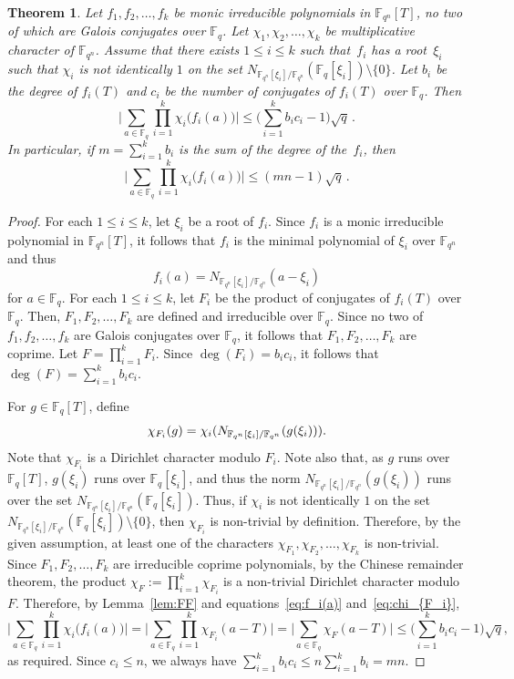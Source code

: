 \documentclass[12pt,reqno]{amsart}
\newtheorem{thm}{Theorem}[section]
\theoremstyle{definition}
\newcommand{\F}{\mathbb{F}}
\begin{document}
\begin{thm}\label{thm:main3}
Let $f_1, f_2,\ldots, f_k$ be monic irreducible polynomials in $\F_{q^n}[T]$, no two of which are Galois conjugates over $\F_q$.  Let $\chi_1,\chi_2,\ldots, \chi_k$ be multiplicative character of $\F_{q^n}$. Assume that there exists $1\leq i \leq k$ such that~$f_i$ has a root~$\xi_i$ such that $\chi_i$ is not identically $1$ on the set $N_{\F_{q^n}[\xi_i]/\F_{q^n}}(\F_q[\xi_i]) \setminus \{0\}$. Let $b_i$ be the degree of $f_i(T)$ and $c_i$ be the number of conjugates of $f_i(T)$ over $\F_q$. Then 
$$\bigg |\sum_{a\in\mathbb{F}_q}\prod_{i=1}^k\chi_i\big(f_i(a)\big) \bigg|\le\bigg(\sum_{i=1}^{k} b_ic_i {}-1\bigg)\sqrt q \,.$$   
In particular, if $m = \sum_{i=1}^{k} b_i$ is the sum of the degree of the~$f_i$, then 
$$\bigg |\sum_{a\in\mathbb{F}_q}\prod_{i=1}^k\chi_i\big(f_i(a)\big) \bigg|\le(mn-1)\sqrt q \,.$$    
\end{thm}
\begin{proof}
For each $1 \leq i \leq k$, let $\xi_i$ be a root of $f_i$. Since $f_i$ is a monic irreducible polynomial in $\F_{q^n}[T]$, it follows that $f_i$ is the minimal polynomial of $\xi_i$ over $\F_{q^n}$ and thus 
\begin{equation}\label{eq:f_i(a)}
f_i(a)=N_{\F_{q^n}[\xi_i]/\F_{q^n}}(a-\xi_i)    
\end{equation}
for $a \in \F_q$. For each $1 \leq i \leq k$, let $F_i$ be the product of conjugates of $f_i(T)$ over $\F_q$. Then, $F_1, F_2, \ldots, F_k$ are defined and irreducible over $\F_q$. Since no two of $f_1, f_2,\ldots, f_k$ are Galois conjugates over $\F_q$, it follows that $F_1, F_2, \ldots, F_k$ are coprime. Let $F=\prod_{i=1}^k F_i$. %
Since $\deg(F_i)=b_ic_i$, it follows that $\deg(F)=\sum_{i=1}^k b_ic_i$.

For $g \in \F_q[T]$, define 
\begin{equation}\label{eq:chi_{F_i}}
\chi_{F_i}(g)=\chi_i(N_{\F_{q^n}[\xi_i]/\F_{q^n}}(g(\xi_i))).
\end{equation}
Note that $\chi_{F_i}$ is a Dirichlet character modulo $F_i$. Note also that, as $g$ runs over $\F_q[T]$, $g(\xi_i)$ runs over $\F_q[\xi_i]$, and thus the norm $N_{\F_{q^n}[\xi_i]/\F_{q^n}}(g(\xi_i))$ runs over the set $N_{\F_{q^n}[\xi_i]/\F_{q^n}}(\F_q[\xi_i])$. Thus, if $\chi_i$ is not identically $1$ on the set $N_{\F_{q^n}[\xi_i]/\F_{q^n}}(\F_q[\xi_i]) \setminus \{0\}$, then $\chi_{F_i}$ is non-trivial by definition. Therefore, by the given assumption, at least one of the characters $\chi_{F_1}, \chi_{F_2}, \ldots, \chi_{F_k}$ is non-trivial. Since $F_1, F_2, \ldots, F_k$ are irreducible coprime polynomials, by the Chinese remainder theorem, the product $\chi_F:=\prod_{i=1}^k \chi_{F_i}$ is a non-trivial Dirichlet character modulo $F$. Therefore, by Lemma~\ref{lem:FF} and equations~\eqref{eq:f_i(a)} and~\eqref{eq:chi_{F_i}},
$$
\bigg |\sum_{a\in\mathbb{F}_q}\prod_{i=1}^k\chi_i\big(f_i(a)\big) \bigg|=\bigg |\sum_{a\in\mathbb{F}_q}\prod_{i=1}^k\chi_{F_i}(a-T) \bigg|=\bigg |\sum_{a\in\mathbb{F}_q}\chi_{F}(a-T) \bigg|\leq \bigg(\sum_{i=1}^k b_ic_i-1\bigg)\sqrt{q},
$$
as required. Since $c_i \leq n$, we always have $\sum_{i=1}^k b_ic_i \leq n \sum_{i=1}^k b_i=mn$.
\end{proof}
\end{document}
